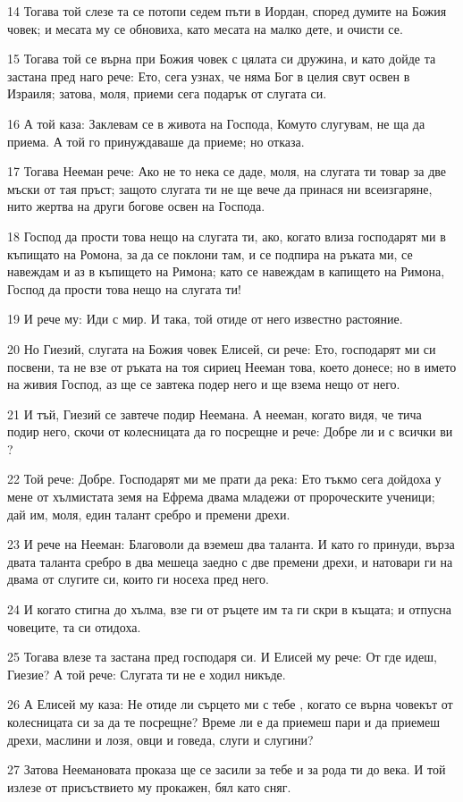\par 14 Тогава той слезе та се потопи седем пъти в Иордан, според думите на Божия човек; и месата му се обновиха, като месата на малко дете, и очисти се.
\par 15 Тогава той се върна при Божия човек с цялата си дружина, и като дойде та застана пред наго рече: Ето, сега узнах, че няма Бог в целия свут освен в Израиля; затова, моля, приеми сега подарък от слугата си.
\par 16 А той каза: Заклевам се в живота на Господа, Комуто слугувам, не ща да приема. А той го принуждаваше да приеме; но отказа.
\par 17 Тогава Нееман рече: Ако не то нека се даде, моля, на слугата ти товар за две мъски от тая пръст; защото слугата ти не ще вече да принася ни всеизгаряне, нито жертва на други богове освен на Господа.
\par 18 Господ да прости това нещо на слугата ти, ако, когато влиза господарят ми в къпищато на Ромона, за да се поклони там, и се подпира на ръката ми, се навеждам и аз в къпището на Римона; като се навеждам в капището на Римона, Господ да прости това нещо на слугата ти!
\par 19 И рече му: Иди с мир. И така, той отиде от него известно растояние.
\par 20 Но Гиезий, слугата на Божия човек Елисей, си рече: Ето, господарят ми си посвени, та не взе от ръката на тоя сириец Нееман това, което донесе; но в името на живия Господ, аз ще се завтека подер него и ще взема нещо от него.
\par 21 И тъй, Гиезий се завтече подир Неемана. А нееман, когато видя, че тича подир него, скочи от колесницата да го посрещне и рече: Добре ли и с всички ви ?
\par 22 Той рече: Добре. Господарят ми ме прати да река: Ето тъкмо сега дойдоха у мене от хълмистата земя на Ефрема двама младежи от пророческите ученици; дай им, моля, един талант сребро и премени дрехи.
\par 23 И рече на Нееман: Благоволи да вземеш два таланта. И като го принуди, върза двата таланта сребро в два мешеца заедно с две премени дрехи, и натовари ги на двама от слугите си, които ги носеха пред него.
\par 24 И когато стигна до хълма, взе ги от ръцете им та ги скри в къщата; и отпусна човеците, та си отидоха.
\par 25 Тогава влезе та застана пред господаря си. И Елисей му рече: От где идеш, Гиезие? А той рече: Слугата ти не е ходил никъде.
\par 26 А Елисей му каза: Не отиде ли сърцето ми с тебе , когато се върна човекът от колесницата си за да те посрещне? Време ли е да приемеш пари и да приемеш дрехи, маслини и лозя, овци и говеда, слуги и слугини?
\par 27 Затова Неемановата проказа ще се засили за тебе и за рода ти до века. И той излезе от присъствието му прокажен, бял като сняг.

